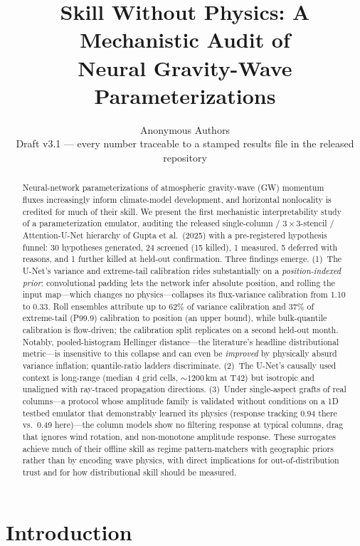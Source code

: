 \documentclass[10pt,twocolumn]{article}
\title{Skill Without Physics: A Mechanistic Audit of\\ Neural Gravity-Wave Parameterizations}
\author{Anonymous Authors\\ \small Draft v3.1 --- every number traceable to a stamped results file in the released repository}
\date{}
\begin{document}
\maketitle

\begin{abstract}
Neural-network parameterizations of atmospheric gravity-wave (GW) momentum fluxes increasingly inform climate-model development, and horizontal nonlocality is credited for much of their skill. We present the first mechanistic interpretability study of a parameterization emulator, auditing the released single-column / $3{\times}3$-stencil / Attention-U-Net hierarchy of Gupta et al.\ (2025) with a pre-registered hypothesis funnel: 30 hypotheses generated, 24 screened (15 killed), 1 measured, 5 deferred with reasons, and 1 further killed at held-out confirmation. Three findings emerge. (1)~The U-Net's variance and extreme-tail calibration rides substantially on a \emph{position-indexed prior}: convolutional padding lets the network infer absolute position, and rolling the input map---which changes no physics---collapses its flux-variance calibration from 1.10 to 0.33. Roll ensembles attribute up to 62\% of variance calibration and 37\% of extreme-tail (P99.9) calibration to position (an upper bound), while bulk-quantile calibration is flow-driven; the calibration split replicates on a second held-out month. Notably, pooled-histogram Hellinger distance---the literature's headline distributional metric---is insensitive to this collapse and can even be \emph{improved} by physically absurd variance inflation; quantile-ratio ladders discriminate. (2)~The U-Net's causally used context is long-range (median 4 grid cells, ${\sim}1200$\,km at T42) but isotropic and unaligned with ray-traced propagation directions. (3)~Under single-aspect grafts of real columns---a protocol whose amplitude family is validated without conditions on a 1D testbed emulator that demonstrably learned its physics (response tracking 0.94 there vs.\ 0.49 here)---the column models show no filtering response at typical columns, drag that ignores wind rotation, and non-monotone amplitude response. These surrogates achieve much of their offline skill as regime pattern-matchers with geographic priors rather than by encoding wave physics, with direct implications for out-of-distribution trust and for how distributional skill should be measured.
\end{abstract}

\section{Introduction}\label{sec:intro}
\end{document}
